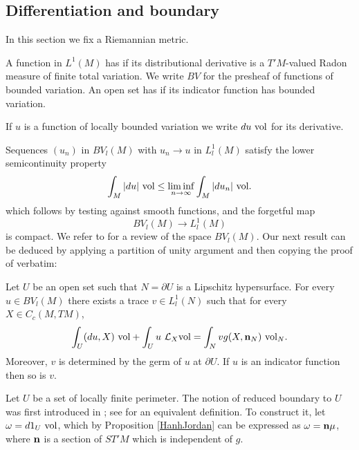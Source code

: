 \subsection{Differentiation and boundary}
In this section we fix a Riemannian metric.

\begin{definition}
A function in $L^1(M)$ has  if its distributional derivative is a $T'M$-valued Radon measure of finite total variation.
We write $BV$ for the presheaf of functions of bounded variation.
An open set has  if its indicator function has bounded variation.
\end{definition}

\begin{notation}
If $u$ is a function of locally bounded variation we write $du ~\mathrm{vol}$ for its derivative.
\end{notation}

Sequences $(u_n)$ in $BV_l(M)$ with $u_n \to u$ in $L^1_l(M)$ satisfy the lower semicontinuity property
\begin{equation}
\label{RieszMarkovDistr}
\int_M |du| ~\mathrm{vol} \leq \liminf_{n \to \infty} \int_M |du_n| ~\mathrm{vol}.
\end{equation}
which follows by testing against smooth functions, and the forgetful map
\begin{equation}\label{Forget}
BV_l(M) \to L^1_l(M)
\end{equation}
is compact. We refer to \cite[Chapter 1]{Giusti77} for a review of the space $BV_l(M)$.
Our next result can be deduced by applying a partition of unity argument and then copying the proof of \cite[Teorema 1]{Miranda67} verbatim:

\begin{proposition}\label{traces}
Let $U$ be an open set such that $N = \partial U$ is a Lipschitz hypersurface.
For every $u \in BV_l(M)$ there exists a trace $v \in L^1_l(N)$ such that for every $X \in C_c(M, TM)$,
\begin{equation}\label{Miranda IBP}
\int_U (du, X) ~\mathrm{vol} + \int_U u ~\mathcal L_X\mathrm{vol} = \int_N vg(X, \mathbf n_N) ~\mathrm{vol}_N.
\end{equation}
Moreover, $v$ is determined by the germ of $u$ at $\partial U$.
If $u$ is an indicator function then so is $v$.
\end{proposition}

Let $U$ be a set of locally finite perimeter.
The notion of reduced boundary to $U$ was first introduced in \cite{deGiorgi55}; see \cite{Battista_2021} for an equivalent definition.
To construct it, let $\omega = d1_U ~\mathrm{vol}$, which by Proposition \ref{HanhJordan} can be expressed as $\omega = \mathbf n \mu$, where $\mathbf n$ is a section of $ST'M$ which is independent of $g$.

